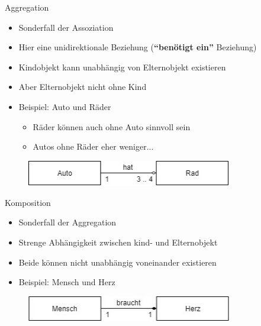 \begin{frame}{Aggregation}
\begin{itemize}
    \item Sonderfall der Assoziation
    \item Hier eine unidirektionale Beziehung (\textbf{"`benötigt ein"'} Beziehung)
    \item Kindobjekt kann unabhängig von Elternobjekt existieren
    \item Aber Elternobjekt nicht ohne Kind
    \item Beispiel: Auto und Räder
    \begin{itemize}
        \item Räder können auch ohne Auto sinnvoll sein
        \item Autos ohne Räder eher weniger...
    \end{itemize}
\end{itemize}
\begin{figure}
    \centering
    \includegraphics[width=0.8\textwidth]{graph/aggregation}
\end{figure}
\end{frame}

\begin{frame}{Komposition}
    \begin{itemize}
        \item Sonderfall der Aggregation
        \item Strenge Abhängigkeit zwischen kind- und Elternobjekt
        \item Beide können nicht unabhängig voneinander existieren
        \item Beispiel: Mensch und Herz
    \end{itemize}
\begin{figure}
    \centering
    \includegraphics[width=0.8\textwidth]{graph/composition}
\end{figure}
\end{frame}

